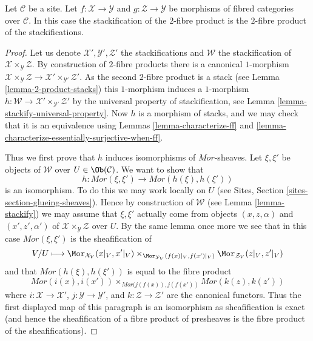 \begin{lemma}
\label{lemma-stackification-fibre-product-fibred-categories}
Let $\mathcal{C}$ be a site.
Let $f : \mathcal{X} \to \mathcal{Y}$ and $g : \mathcal{Z} \to \mathcal{Y}$
be morphisms of fibred categories over $\mathcal{C}$.
In this case the stackification of the $2$-fibre product is the $2$-fibre
product of the stackifications.
\end{lemma}

\begin{proof}
Let us denote $\mathcal{X}', \mathcal{Y}', \mathcal{Z}'$ the stackifications
and $\mathcal{W}$ the stackification of
$\mathcal{X} \times_\mathcal{Y} \mathcal{Z}$. By construction of $2$-fibre
products there is a canonical $1$-morphism
$\mathcal{X} \times_\mathcal{Y} \mathcal{Z} \to
\mathcal{X}' \times_{\mathcal{Y}'} \mathcal{Z}'$.
As the second $2$-fibre product is a stack (see
Lemma \ref{lemma-2-product-stacks})
this $1$-morphism induces a $1$-morphism
$h : \mathcal{W} \to \mathcal{X}' \times_{\mathcal{Y}'} \mathcal{Z}'$
by the universal property of stackification, see
Lemma \ref{lemma-stackify-universal-property}.
Now $h$ is a morphism of stacks, and we may check that it is an
equivalence using
Lemmas \ref{lemma-characterize-ff} and
\ref{lemma-characterize-essentially-surjective-when-ff}.

\medskip\noindent
Thus we first prove that $h$ induces isomorphisms of $\mathit{Mor}$-sheaves.
Let $\xi, \xi'$ be objects of $\mathcal{W}$ over
$U \in \Ob(\mathcal{C})$. We want to show that
$$
h : \mathit{Mor}(\xi, \xi') \longrightarrow \mathit{Mor}(h(\xi), h(\xi'))
$$
is an isomorphism. To do this we may work locally on $U$ (see
Sites, Section \ref{sites-section-glueing-sheaves}).
Hence by construction of $\mathcal{W}$ (see
Lemma \ref{lemma-stackify})
we may assume that $\xi, \xi'$
actually come from objects $(x, z, \alpha)$ and $(x', z', \alpha')$
of $\mathcal{X} \times_\mathcal{Y} \mathcal{Z}$ over $U$.
By the same lemma once more we see that in this case
$\mathit{Mor}(\xi, \xi')$ is the sheafification of
$$
V/U \longmapsto
\Mor_{\mathcal{X}_V}(x|_V, x'|_V)
\times_{\Mor_{\mathcal{Y}_V}(f(x)|_V, f(x')|_V)}
\Mor_{\mathcal{Z}_V}(z|_V, z'|_V)
$$
and that $\mathit{Mor}(h(\xi), h(\xi'))$ is equal to the fibre product
$$
\mathit{Mor}(i(x), i(x'))
\times_{\mathit{Mor}(j(f(x)), j(f(x'))}
\mathit{Mor}(k(z), k(z'))
$$
where $i : \mathcal{X} \to \mathcal{X}'$,
$j : \mathcal{Y} \to \mathcal{Y}'$, and
$k : \mathcal{Z} \to \mathcal{Z}'$ are the canonical functors.
Thus the first displayed map of this paragraph is an isomorphism as
sheafification is exact (and hence the sheafification of a fibre product
of presheaves is the fibre product of the sheafifications).


\end{proof}
